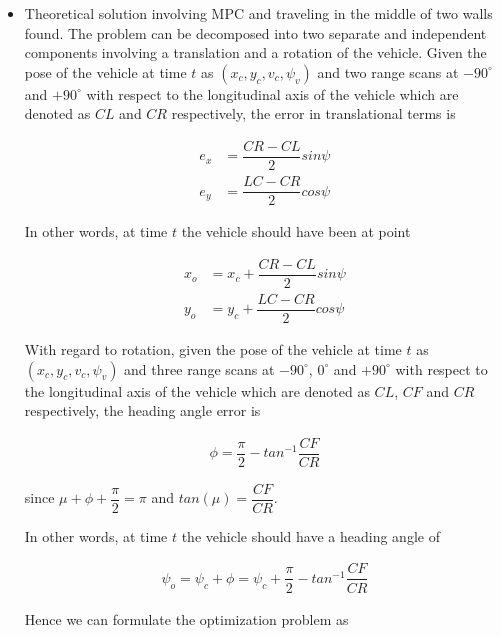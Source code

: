 \documentclass[oneside,12pt]{article}
\begin{document}
\begin{itemize}
  \item Theoretical solution involving MPC and traveling in the middle of two
    walls found. The problem can be decomposed into two separate and independent
    components involving a translation and a rotation of the vehicle. Given the
    pose of the vehicle at time $t$ as $(x_c, y_c, v_c, \psi_v)$ and two range
    scans at $-90^\circ$ and $+90^\circ$ with respect to the longitudinal axis of
    the vehicle which are denoted as $CL$ and $CR$ respectively, the error in
    translational terms is

    \begin{align}
      e_x &= \dfrac{CR-CL}{2}sin\psi \\
      e_y &= \dfrac{LC-CR}{2}cos\psi
    \end{align}

    In other words, at time $t$ the vehicle should have been at point

    \begin{align}
      x_o &=x_c + \dfrac{CR-CL}{2}sin\psi \\
      y_o &=y_c + \dfrac{LC-CR}{2}cos\psi
    \end{align}

    With regard to rotation, given the pose of the vehicle at time $t$ as
    $(x_c, y_c, v_c, \psi_v)$ and three range scans at $-90^\circ$, $0^\circ$ and
    $+90^\circ$ with respect to the longitudinal axis of the vehicle which are
    denoted as $CL$, $CF$ and $CR$ respectively, the heading angle error is

    \begin{align}
      \phi = \dfrac{\pi}{2} - tan^{-1}\dfrac{CF}{CR}
    \end{align}

    since $\mu + \phi + \dfrac{\pi}{2} = \pi$ and $tan(\mu) = \dfrac{CF}{CR}$.

    In other words, at time $t$ the vehicle should have a heading angle of

    \begin{align}
      \psi_o = \psi_c + \phi = \psi_c + \dfrac{\pi}{2} - tan^{-1}\dfrac{CF}{CR}
    \end{align}


    \begin{figure}[H]
      \scalebox{1}{}
      \caption{}
      \label{}
    \end{figure}

    Hence we can formulate the optimization problem as


\end{itemize}
\end{document}
